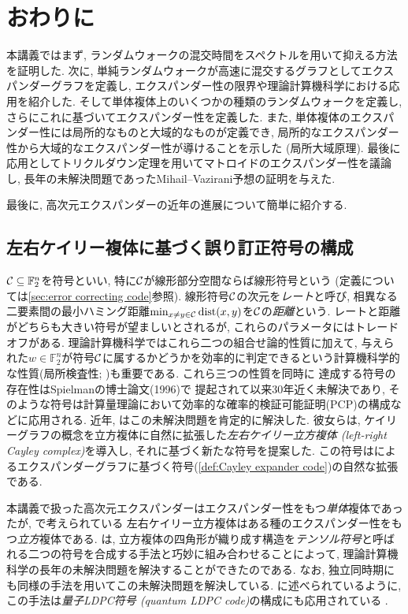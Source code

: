 \chapter{おわりに}
本講義ではまず, ランダムウォークの混交時間をスペクトルを用いて抑える方法を証明した.
次に, 単純ランダムウォークが高速に混交するグラフとしてエクスパンダーグラフを定義し,
エクスパンダー性の限界や理論計算機科学における応用を紹介した.
そして単体複体上のいくつかの種類のランダムウォークを定義し,
さらにこれに基づいてエクスパンダー性を定義した.
また, 単体複体のエクスパンダー性には局所的なものと大域的なものが定義でき,
局所的なエクスパンダー性から大域的なエクスパンダー性が導けることを示した (局所大域原理).
最後に応用としてトリクルダウン定理を用いてマトロイドのエクスパンダー性を議論し,
長年の未解決問題であったMihail--Vazirani予想の証明を与えた.

最後に, 高次元エクスパンダーの近年の進展について簡単に紹介する.
%
\section{左右ケイリー複体に基づく誤り訂正符号の構成}
$\mathcal{C}\subseteq \mathbb{F}_2^n$を符号といい, 特に$\mathcal{C}$が線形部分空間ならば線形符号という (定義については\cref{sec:error correcting code}参照).
線形符号$\mathcal{C}$の次元を\emph{レート}と呼び,
相異なる二要素間の最小ハミング距離$\min_{x\neq y\in \mathcal{C}}\mathrm{dist}(x,y)$を$\mathcal{C}$の\emph{距離}という.
レートと距離がどちらも大きい符号が望ましいとされるが, これらのパラメータにはトレードオフがある.
理論計算機科学ではこれら二つの組合せ論的性質に加えて, 与えられた$w\in\mathbb{F}_2^n$が符号$\mathcal{C}$に属するかどうかを効率的に判定できるという計算機科学的な性質(局所検査性; \citet{GS06})も重要である.
これら三つの性質を同時に
達成する符号の存在性はSpielmanの博士論文(1996)で
提起されて以来30年近く未解決であり, そのような符号は計算量理論において効率的な確率的検証可能証明(PCP)の構成などに応用される.
近年, \citet{DELLM22}はこの未解決問題を肯定的に解決した.
彼女らは, ケイリーグラフの概念を立方複体に自然に拡張した\emph{左右ケイリー立方複体 (left-right Cayley complex)}を導入し, それに基づく新たな符号を提案した.
この符号は\cite{SS96}によるエクスパンダーグラフに基づく符号(\cref{def:Cayley expander code})の自然な拡張である.

本講義で扱った高次元エクスパンダーはエクスパンダー性をもつ\emph{単体}複体であったが, \cite{DELLM22}で考えられている
左右ケイリー立方複体はある種のエクスパンダー性をもつ\emph{立方}複体である.
\citet{DELLM22}は, 立方複体の四角形が織り成す構造を\emph{テンソル符号}と呼ばれる二つの符号を合成する手法と巧妙に組み合わせることによって, 理論計算機科学の長年の未解決問題を解決することができたのである.
なお, 独立同時期に\citet{LH22,PK22}も同様の手法を用いてこの未解決問題を解決している.
\cite{LH22,PK22}に述べられているように, この手法は\emph{量子LDPC符号 (quantum LDPC code)}の構成にも応用されている \cite{LZ22}.